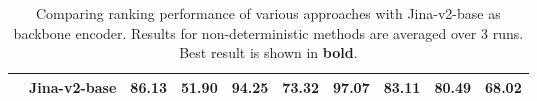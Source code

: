 \begin{table*}[!t]
{\begin{tabular}{ll cccc cccc}
   
    & Jina-v2-base 
      & \textbf{86.13}&\textbf{51.90} & \textbf{94.25}&\textbf{73.32}
      & \textbf{97.07} & \textbf{83.11} &\textbf{ 80.49} & \textbf{68.02}\\
      
      \bottomrule
    \end{tabular}
  }
  \caption{Comparing ranking performance of various approaches with Jina-v2-base as backbone encoder. Results for non-deterministic methods are averaged over 3 runs. Best result is shown in \textbf{bold}.}
  \vspace{-10pt}
\label{tbl:main_exp_e5}
\end{table*}